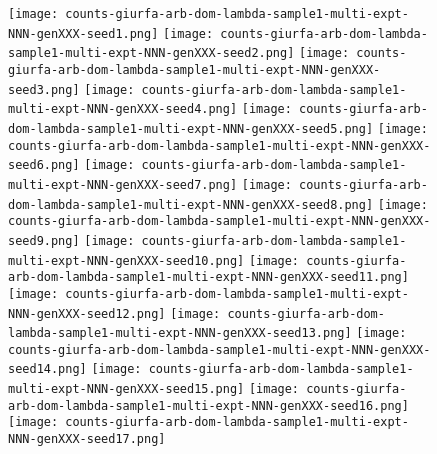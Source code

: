 \documentclass[12pt]{article}
\begin{document}
\begin{figure}
%
  \centering
  \texttt{[image: counts-giurfa-arb-dom-lambda-sample1-multi-expt-NNN-genXXX-seed1.png]}\hspace{-7mm}
  \texttt{[image: counts-giurfa-arb-dom-lambda-sample1-multi-expt-NNN-genXXX-seed2.png]}\hspace{-7mm}
  \texttt{[image: counts-giurfa-arb-dom-lambda-sample1-multi-expt-NNN-genXXX-seed3.png]}\hspace{-7mm}
  \texttt{[image: counts-giurfa-arb-dom-lambda-sample1-multi-expt-NNN-genXXX-seed4.png]}\hspace{-7mm}
  \texttt{[image: counts-giurfa-arb-dom-lambda-sample1-multi-expt-NNN-genXXX-seed5.png]}
%
  \texttt{[image: counts-giurfa-arb-dom-lambda-sample1-multi-expt-NNN-genXXX-seed6.png]}\hspace{-7mm}
  \texttt{[image: counts-giurfa-arb-dom-lambda-sample1-multi-expt-NNN-genXXX-seed7.png]}\hspace{-7mm}
  \texttt{[image: counts-giurfa-arb-dom-lambda-sample1-multi-expt-NNN-genXXX-seed8.png]}\hspace{-7mm}
  \texttt{[image: counts-giurfa-arb-dom-lambda-sample1-multi-expt-NNN-genXXX-seed9.png]}\hspace{-7mm}
  \texttt{[image: counts-giurfa-arb-dom-lambda-sample1-multi-expt-NNN-genXXX-seed10.png]}
%
  \texttt{[image: counts-giurfa-arb-dom-lambda-sample1-multi-expt-NNN-genXXX-seed11.png]}\hspace{-7mm}
  \texttt{[image: counts-giurfa-arb-dom-lambda-sample1-multi-expt-NNN-genXXX-seed12.png]}\hspace{-7mm}
  \texttt{[image: counts-giurfa-arb-dom-lambda-sample1-multi-expt-NNN-genXXX-seed13.png]}\hspace{-7mm}
  \texttt{[image: counts-giurfa-arb-dom-lambda-sample1-multi-expt-NNN-genXXX-seed14.png]}\hspace{-7mm}
  \texttt{[image: counts-giurfa-arb-dom-lambda-sample1-multi-expt-NNN-genXXX-seed15.png]}
%
  \texttt{[image: counts-giurfa-arb-dom-lambda-sample1-multi-expt-NNN-genXXX-seed16.png]}\hspace{-7mm}
  \texttt{[image: counts-giurfa-arb-dom-lambda-sample1-multi-expt-NNN-genXXX-seed17.png]}\hspace{-7mm}

\end{figure}
\end{document}
